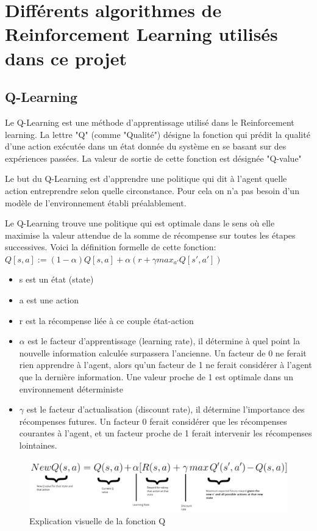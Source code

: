 \documentclass[a4paper,10pt,openany,oneside]{report}
\begin{document}
\section{Différents algorithmes de Reinforcement Learning utilisés dans ce projet}
\subsection{Q-Learning}
Le Q-Learning est une méthode d'apprentissage utilisé dans le Reinforcement learning. La lettre "Q" (comme "Qualité") désigne la fonction qui prédit la qualité d'une action exécutée dans un état donnée du système en se basant sur des expériences passées. La valeur de sortie de cette fonction est désignée "Q-value" \cite[]{wikipediaRL}

Le but du Q-Learning est d'apprendre une politique qui dit à l'agent quelle action entreprendre selon quelle circonstance. Pour cela on n'a pas besoin d'un modèle de l'environnement établi préalablement.

Le Q-Learning trouve une politique qui est optimale dans le sens où elle maximise la valeur attendue de la somme de récompense sur toutes les étapes successives.
\newpage
Voici la définition formelle de cette fonction:
$Q[s, a] := (1-\alpha)Q[s, a] + \alpha(r+\gamma max_{a'}Q[s', a'])$

\begin{itemize}
	\item s est un état (state)
	\item a est une action
	\item r est la récompense liée à ce couple état-action
	\item $\alpha$ est le facteur d'apprentissage (learning rate), il détermine à quel point la nouvelle information calculée surpassera l'ancienne. Un facteur de 0 ne ferait rien apprendre à l'agent, alors qu'un facteur de 1 ne ferait considérer à l'agent que la dernière information. Une valeur proche de 1 est optimale dans un environnement déterministe
	\item $\gamma$ est le facteur d'actualisation (discount rate), il détermine l'importance des récompenses futures. Un facteur 0 ferait considérer que les récompenses courantes à l'agent, et un facteur proche de 1 ferait intervenir les récompenses lointaines.
\end{itemize}
\begin{figure}[H]
	\centering
	\includegraphics[width=1\textwidth]{img/qfunction.png}
	\caption{Explication visuelle de la fonction Q \cite[]{freecodecamp}}
\end{figure}
\end{document}
